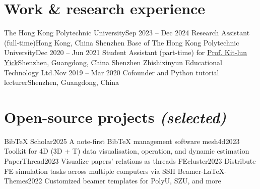 \documentclass[letterpaper,11pt]{article}
\begin{document}
    \section{Work \& research experience}

    \resumeColumnsStart
        \resumeEntry
            {The Hong Kong Polytechnic University}{Sep 2023 -- Dec 2024}
            {Research Assistant (full-time)}{Hong Kong, China}
        \resumeEntry
            {Shenzhen Base of The Hong Kong Polytechnic University}{Dec 2020 -- Jun 2021}
            {Student Assistant (part-time) for \href{https://research.polyu.edu.hk/en/persons/kit-lun-yick}{Prof. Kit-lun Yick}}{Shenzhen, Guangdong, China}
        \resumeEntry
            {Shenzhen Zhishixinyun Educational Technology Ltd.}{Nov 2019 -- Mar 2020}
            {Cofounder and Python tutorial lecturer}{Shenzhen, Guangdong, China}
    \resumeColumnsEnd

    \section{Open-source projects \emph{(selected)}}

    \resumeColumnsStart
        \resumeEntry
            {BibTeX Scholar}{2025}
            {A note-first BibTeX management software}{}
        \resumeEntry
            {mesh4d}{2023}
            {Toolkit for 4D (3D + T) data visualisation, operation, and dynamic estimation}{}
        \resumeEntry
            {PaperThread}{2023}
            {Visualize papers' relations as threads}{}
        \resumeEntry
            {FEcluster}{2023}
            {Distribute FE simulation tasks across multiple computers via SSH}{}
        \resumeEntry
            {Beamer-LaTeX-Themes}{2022}
            {Customized beamer templates for PolyU, SZU, and more}{}
    \resumeColumnsEnd
\end{document}
